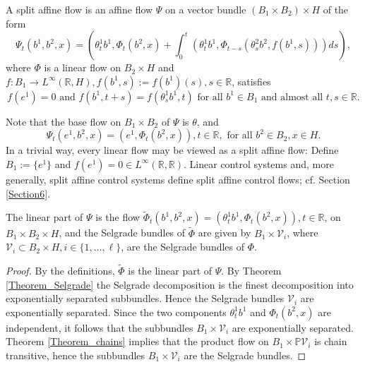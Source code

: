 	\begin{definition}
		A split affine flow is an affine flow $\Psi$ on a vector bundle $\left(
		B_{1}\times B_{2}\right)  \times H$ of the form
		\[
		\Psi_{t}(b^{1},b^{2},x)=\left(  \theta_{t}^{1}b^{1},\Phi_{t}(b^{2},x)+\int
		_{0}^{t}\left(  \theta_{t}^{1}b^{1},\Phi_{t-s}(\theta_{s}^{2}b^{2}%
		,f(b^{1},s))\right)  ds\right)  ,
		\]
		where $\Phi$ is a linear flow on $B_{2}\times H$ and $f:B_{1}\rightarrow
		L^{\infty}(\mathbb{R},H),f(b^{1},s):=f(b^{1})(s),s\in\mathbb{R}$, satisfies
		\[
		f(e^{1})=0\mbox{ and }f(b^{1},t+s)=f(\theta_{s}^{1}b^{1},t)\mbox{ for all
		}b^{1}\in B_{1}\mbox{ and almost all }t,s\in\mathbb{R}.
		\]
		
	\end{definition}
	
	Note that the base flow on $B_{1}\times B_{2}$ of $\Psi$ is $\theta$, and
	\[
	\Psi_{t}(e^{1},b^{2},x)=(e^{1},\Phi_{t}(b^{2},x)),t\in\mathbb{R}%
	,\mbox{ for all }b^{2}\in B_{2},x\in H.
	\]
	In a trivial way, every linear flow may be viewed as a split affine flow:
	Define $B_{1}:=\{e^{1}\}$ and $f(e^{1})=0\in L^{\infty}(\mathbb{R}%
	,\mathbb{R})$. Linear control systems and, more generally, split affine
	control systems define split affine control flows; cf. Section \ref{Section6}.
	
	\begin{lemma}
		\label{Lemma_A}The linear part of $\Psi$ is the flow $\widetilde{\Phi}%
		_{t}(b^{1},b^{2},x)=\left(  \theta_{t}^{1}b^{1},\Phi_{t}(b^{2},x)\right)
		,\allowbreak t\in\mathbb{R}$, on $B_{1}\times B_{2}\times H$, and the Selgrade
		bundles of $\widetilde{\Phi}$ are given by $B_{1}\times\mathcal{V}_{i}$, where
		$\mathcal{V}_{i}\subset B_{2}\times H,i\in\{1,\ldots,\ell\}$, are the Selgrade
		bundles of $\Phi$.
	\end{lemma}
	
	\begin{proof}
		By the definitions, $\widetilde{\Phi}$ is the linear part of $\Psi$. By
		Theorem \ref{Theorem_Selgrade} the Selgrade decomposition is the finest
		decomposition into exponentially separated subbundles. Hence the Selgrade
		bundles $\mathcal{V}_{i}$ are exponentially separated. Since the two
		components $\theta_{t}^{1}b^{1}$ and $\Phi_{t}(b^{2},x)$ are independent, it
		follows that the subbundles $B_{1}\times\mathcal{V}_{i}$ are exponentially
		separated. Theorem \ref{Theorem_chains} implies that the product flow on
		$B_{1}\times\mathbb{P}\mathcal{V}_{i}$ is chain transitive, hence the
		subbundles $B_{1}\times\mathcal{V}_{i}$ are the Selgrade bundles.
	\end{proof}
	
